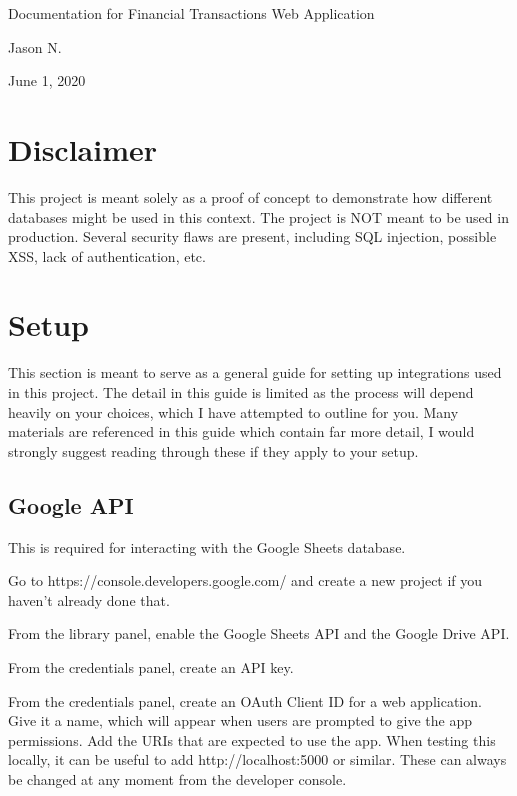 \documentclass[letterpaper]{article}
\begin{document}
\vspace*{\fill}
\begin{center}
    \Large
    Documentation for Financial Transactions Web Application

    \large
    Jason N.

    June 1, 2020
\end{center}
\vspace*{\fill}

\newpage
{}
\tableofcontents

\newpage
{}
\parskip 10pt

\section{Disclaimer}

This project is meant solely as a proof of concept to demonstrate how different databases might be used in this context.
The project is NOT meant to be used in production.
Several security flaws are present, including SQL injection, possible XSS, lack of authentication, etc.

\section{Setup}

This section is meant to serve as a general guide for setting up integrations used in this project.
The detail in this guide is limited as the process will depend heavily on your choices, which I have attempted to outline for you.
Many materials are referenced in this guide which contain far more detail, I would strongly suggest reading through these if they apply to your setup.

\subsection{Google API}

This is required for interacting with the Google Sheets database.

Go to https://console.developers.google.com/ and create a new project if you haven't already done that.

From the library panel, enable the Google Sheets API and the Google Drive API.

From the credentials panel, create an API key.

From the credentials panel, create an OAuth Client ID for a web application.
Give it a name, which will appear when users are prompted to give the app permissions.
Add the URIs that are expected to use the app.
When testing this locally, it can be useful to add http://localhost:5000 or similar.
These can always be changed at any moment from the developer console.
\end{document}
